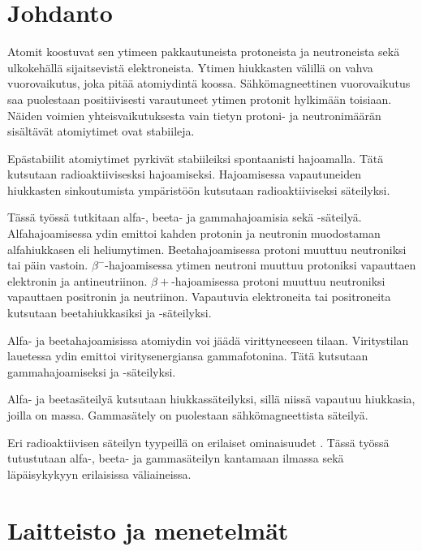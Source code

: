 \documentclass[a4paper,11pt]{article}
\begin{document}
\section{Johdanto}

Atomit koostuvat sen ytimeen pakkautuneista protoneista ja neutroneista sekä ulkokehällä sijaitsevistä elektroneista. Ytimen hiukkasten välillä on vahva vuorovaikutus, joka pitää atomiydintä koossa. Sähkömagneettinen vuorovaikutus saa puolestaan positiivisesti varautuneet ytimen protonit hylkimään toisiaan. Näiden voimien yhteisvaikutuksesta vain tietyn protoni- ja neutronimäärän sisältävät atomiytimet ovat stabiileja. \cite{ohje, wiki:radioaktiivisuus}

Epästabiilit atomiytimet pyrkivät stabiileiksi spontaanisti hajoamalla. Tätä kutsutaan radioaktiivisesksi hajoamiseksi. Hajoamisessa vapautuneiden hiukkasten sinkoutumista ympäristöön kutsutaan radioaktiiviseksi säteilyksi. \cite{ohje, wiki:radioaktiivisuus}

Tässä työssä tutkitaan alfa-, beeta- ja gammahajoamisia sekä -säteilyä. Alfahajoamisessa ydin emittoi kahden protonin ja neutronin muodostaman alfahiukkasen eli heliumytimen. Beetahajoamisessa protoni muuttuu neutroniksi tai päin vastoin. $\beta^-$-hajoamisessa ytimen neutroni muuttuu protoniksi vapauttaen elektronin ja antineutriinon. $\beta+$-hajoamisessa protoni muuttuu neutroniksi vapauttaen positronin ja neutriinon. Vapautuvia elektroneita tai positroneita kutsutaan beetahiukkasiksi ja -säteilyksi. \cite{ohje, wiki:radioaktiivisuus}

Alfa- ja beetahajoamisissa atomiydin voi jäädä virittyneeseen tilaan. Viritystilan lauetessa ydin emittoi viritysenergiansa gammafotonina. Tätä kutsutaan gammahajoamiseksi ja -säteilyksi. \cite{ohje, wiki:radioaktiivisuus}

Alfa- ja beetasäteilyä kutsutaan hiukkassäteilyksi, sillä niissä vapautuu hiukkasia, joilla on massa. Gammasätely on puolestaan sähkömagneettista säteilyä. \cite{ohje, wiki:radioaktiivisuus}

Eri radioaktiivisen säteilyn tyypeillä on erilaiset ominaisuudet \cite{ohje, wiki:radioaktiivisuus}. Tässä työssä tutustutaan alfa-, beeta- ja gammasäteilyn kantamaan ilmassa sekä läpäisykykyyn erilaisissa väliaineissa. 

\section{Laitteisto ja menetelmät}
\end{document}
